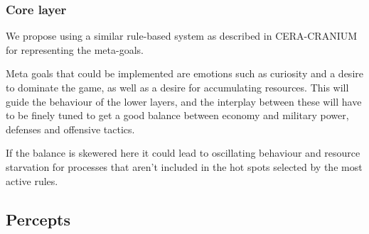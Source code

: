 \subsubsection{Core layer}
We propose using a similar rule-based system as described in CERA-CRANIUM for
representing the meta-goals.

Meta goals that could be implemented are emotions such as curiosity and a
desire to dominate the game, as well as a desire for accumulating resources.
This will guide the behaviour of the lower layers, and the interplay between
these will have to be finely tuned to get a good balance between economy and
military power, defenses and offensive tactics.

If the balance is skewered here it could lead to oscillating behaviour and
resource starvation for processes that aren't included in the hot spots
selected by the most active rules.

\subsection{Percepts}
